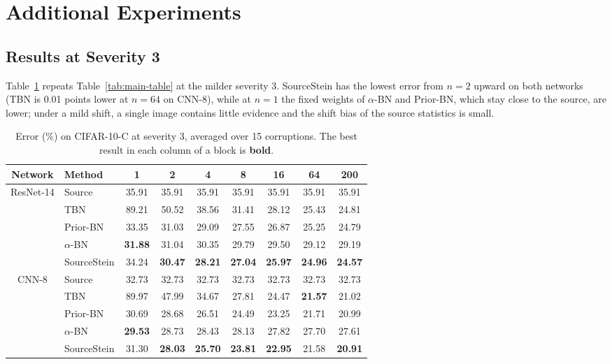 \clearpage
\section{Additional Experiments} \label{apdx:experiments}

\subsection{Results at Severity 3} \label{apdx:severity3}
Table~\ref{tab:apdx-sev3} repeats Table~\ref{tab:main-table} at the milder severity 3.
SourceStein has the lowest error from $n{=}2$ upward on both networks (TBN is 0.01 points lower at $n{=}64$ on CNN-8), while at $n{=}1$ the fixed weights of $\alpha$-BN and Prior-BN, which stay close to the source, are lower; under a mild shift, a single image contains little evidence and the shift bias of the source statistics is small.

\begin{table}[ht]
\centering
\renewcommand{\arraystretch}{0.9}
\caption{Error (\%) on CIFAR-10-C at severity 3, averaged over 15 corruptions. The best result in each column of a block is \textbf{bold}.}
\label{tab:apdx-sev3}
\begin{tabular}{cl|ccccccc}
\toprule
\textbf{Network} & \textbf{Method} & \textbf{1} & \textbf{2} & \textbf{4} & \textbf{8} & \textbf{16} & \textbf{64} & \textbf{200} \\
\midrule
\multirow{5}{*}{ResNet-14}
 & Source & 35.91 & 35.91 & 35.91 & 35.91 & 35.91 & 35.91 & 35.91 \\
 & TBN & 89.21 & 50.52 & 38.56 & 31.41 & 28.12 & 25.43 & 24.81 \\
 & Prior-BN & 33.35 & 31.03 & 29.09 & 27.55 & 26.87 & 25.25 & 24.79 \\
 & $\alpha$-BN & \textbf{31.88} & 31.04 & 30.35 & 29.79 & 29.50 & 29.12 & 29.19 \\
 & \cellcolor{oursrowblue}SourceStein & \cellcolor{oursrowblue}34.24 & \cellcolor{oursrowblue}\textbf{30.47} & \cellcolor{oursrowblue}\textbf{28.21} & \cellcolor{oursrowblue}\textbf{27.04} & \cellcolor{oursrowblue}\textbf{25.97} & \cellcolor{oursrowblue}\textbf{24.96} & \cellcolor{oursrowblue}\textbf{24.57} \\
\midrule\midrule
\multirow{5}{*}{CNN-8}
 & Source & 32.73 & 32.73 & 32.73 & 32.73 & 32.73 & 32.73 & 32.73 \\
 & TBN & 89.97 & 47.99 & 34.67 & 27.81 & 24.47 & \textbf{21.57} & 21.02 \\
 & Prior-BN & 30.69 & 28.68 & 26.51 & 24.49 & 23.25 & 21.71 & 20.99 \\
 & $\alpha$-BN & \textbf{29.53} & 28.73 & 28.43 & 28.13 & 27.82 & 27.70 & 27.61 \\
 & \cellcolor{oursrowblue}SourceStein & \cellcolor{oursrowblue}31.30 & \cellcolor{oursrowblue}\textbf{28.03} & \cellcolor{oursrowblue}\textbf{25.70} & \cellcolor{oursrowblue}\textbf{23.81} & \cellcolor{oursrowblue}\textbf{22.95} & \cellcolor{oursrowblue}21.58 & \cellcolor{oursrowblue}\textbf{20.91} \\
\bottomrule
\end{tabular}
\end{table}

